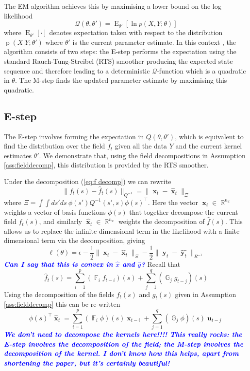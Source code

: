 \documentclass{IEEEtran}
\newcommand{\todo}[1]{\textsf{\emph{\textbf{\textcolor{blue}{#1}}}}}
\newcommand{\dist}[2]{\|#1\|_{#2}}
\DeclareMathOperator{\E}{E}
\DeclareMathOperator{\R}{\mathbb{R}}
\DeclareMathOperator{\F}{\mathbb{F}}
\DeclareMathOperator{\G}{\mathbb{G}}
\DeclareMathOperator{\p}{p}
\DeclareMathOperator{\xvec}{\mathbf{x}}
\DeclareMathOperator{\uvec}{\mathbf{u}}
\DeclareMathOperator{\yvec}{\mathbf{y}}
\begin{document}
The EM algorithm achieves this by maximising a lower bound on the log likelihood
\begin{equation}
	\mathcal{Q}(\theta,\theta')=\E_{\theta'}\left[\ln p(X,Y;\theta)\right]
\end{equation}
where $\E_{\theta'}[\cdot]$ denotes expectation taken with respect to the distribution $\p(X|Y ; \theta')$ where $\theta'$ is the current parameter estimate. In this context \cite{Gibson05}, the algorithm consists of two steps: the E-step performs the expectation using the standard Rauch-Tung-Streibel (RTS) smoother \cite{Rauch65} producing the expected state sequence and therefore leading to a deterministic $\mathcal{Q}$-function which is a quadratic in $\theta$. The M-step finds the updated parameter estimate by maximising this quadratic.

\subsection{E-step}

The E-step involves forming the expectation in $Q(\theta,\theta')$, which is equivalent to find the distribution over the field $f_t$ given all the data $Y$ and the current kernel estimates $\theta'$. We demonstrate that, using the field decompositions in Assumption \ref{ass:fielddecomp}, this distribution is provided by the RTS smoother. 

Under the decomposition (\ref{eq:f decomp}) we can rewrite 
\begin{equation}
	\dist{f_t(s) - \hat{f}_t(s)}{Q^{-1}} = \dist{\xvec_t - \hat{\xvec}_t}{\Xi}
\end{equation}
where $\Xi = \int\int ds' ds ~ \phi(s')Q^{-1}(s',s)\phi(s)^\top$. Here the vector $\xvec_t \in \R^{n_x}$ weights a vector of basis functions $\phi(s)$ that together decompose the current field $f_t(s)$, and similarly $\hat{\xvec}_t \in \R^{n_x}$ weights the decomposition of $\hat{f}(s)$. This allows us to replace the infinite dimensional term in the likelihood with a finite dimensional term via the decomposition, giving
\begin{equation}
	\ell(\theta) =  \epsilon  - \frac{1}{2}\dist{\xvec_t - \hat{\xvec}_t}{\Xi} - \frac{1}{2}\dist{\yvec_t-\hat{\yvec_t}}{R^{-1}}
\end{equation}
\todo{Can I say that this is convex in $\hat{x}$ and $\hat{y}$?}
Recall that
\begin{equation}
	\hat{f}_t(s) = \sum_{i=1}^{p}( \F_i f_{t-i})(s) + \sum_{j=1}^{q}(\G_j g_{t-j})(s)
\end{equation}
Using the decomposition of the fields $f_t(s)$ and $g_t(s)$ given in Assumption \ref{ass:fielddecomp} this can be re-written
\begin{equation}
	\phi(s)^\top\hat{\xvec}_t = \sum_{i=1}^{p}(\F_i \phi)(s)\xvec_{t-i} + \sum_{j=1}^{q}(\G_j\phi)(s)\uvec_{t-j}
\end{equation}
\todo{We don't need to decompose the kernels here!!!! This really rocks: the E-step involves the decomposition of the field; the M-step involves the decomposition of the kernel. I don't know how this helps, apart from shortening the paper, but it's certainly beautiful!}
\end{document}
